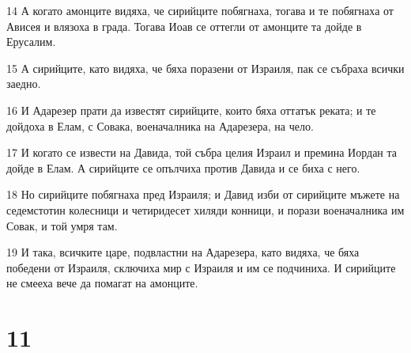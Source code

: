 \par 14 А когато амонците видяха, че сирийците побягнаха, тогава и те побягнаха от Ависея и влязоха в града. Тогава Иоав се оттегли от амонците та дойде в Ерусалим.
\par 15 А сирийците, като видяха, че бяха поразени от Израиля, пак се събраха всички заедно.
\par 16 И Адарезер прати да известят сирийците, които бяха оттатък реката; и те дойдоха в Елам, с Совака, военачалника на Адарезера, на чело.
\par 17 И когато се извести на Давида, той събра целия Израил и премина Иордан та дойде в Елам. А сирийците се опълчиха против Давида и се биха с него.
\par 18 Но сирийците побягнаха пред Израиля; и Давид изби от сирийците мъжете на седемстотин колесници и четиридесет хиляди конници, и порази военачалника им Совак, и той умря там.
\par 19 И така, всичките царе, подвластни на Адарезера, като видяха, че бяха победени от Израиля, сключиха мир с Израиля и им се подчиниха. И сирийците не смееха вече да помагат на амонците.

\chapter{11}

